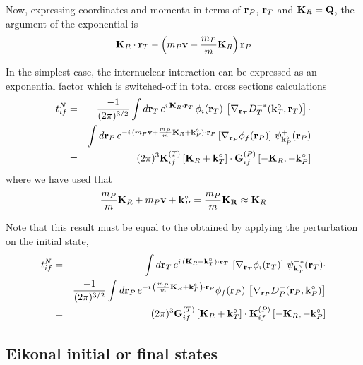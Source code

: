 Now, expressing coordinates and momenta in terms of $\mathbf{r}_{P}$,
$\mathbf{r}_{T}$ and $\mathbf{K}_{R}=\mathbf{Q}$, the argument of the exponential
is
\[
\mathbf{K}_{R} \cdot \mathbf{r}_{T} - \left( m_{P} \mathbf{v} + \frac{m_{P}}{m}
\mathbf{K}_{R} \right)\mathbf{r}_{P}
\]


In the simplest case, the internuclear interaction can be expressed as
an exponential factor which is switched-off in total cross sections
calculations
\begin{eqnarray}\label{Q:tif-cpt-noNN-f}
t_{if}^{N} &=& \frac{-1}{(2 \pi)^{3/2}}  \int d \mathbf{r}_{T} \,
e^{i \, \mathbf{K}_{R} \cdot \mathbf{r}_T} \, \phi_{i}(\mathbf{r}_T) \,\left[
\nabla_{\mathbf{r}_{T}} D^{-*}_{T}(\mathbf{k}^{\circ}_{T},\mathbf{r}_T) \right]  \cdot
\nonumber \\
&& \int d \mathbf{r}_{P} \, e^{- i \, (m_{P} \mathbf{v} +
\frac{m_{P}}{m} \mathbf{K}_{R} + \mathbf{k}_{P}^{\circ}) \cdot \mathbf{r}_{P}}
\left[\nabla_{\mathbf{r}_{P}} \phi_{f}(\mathbf{r}_{P}) \right] \,
\psi^{+}_{\mathbf{k}_{P}^{\circ}} (\mathbf{r}_{P}) \nonumber
\\
&=& (2 \pi)^{3} \mathbf{K}^{(T)}_{if}\left[ \mathbf{K}_{R} + \mathbf{k}_{T}^{\circ}
\right] \cdot \mathbf{G}^{(P)}_{if}\left[-\mathbf{K}_{R},-\mathbf{k}^{\circ}_{P}\right]
\end{eqnarray}
where we have used that
\[
\frac{m_{P}}{m} \mathbf{K}_{R} + m_{P}\mathbf{v} + \mathbf{k}_{P}^{\circ} =
\frac{m_{P}}{m} \mathbf{K_{R}} \approx \mathbf{K}_{R}
\]

Note that this result must be equal to the obtained by applying the
perturbation on the initial state,
%
\begin{eqnarray}\label{Q:tif-cpt-noNN-i}
t_{if}^{N} &=&  \int d \mathbf{r}_{T} \, e^{i \,(
\mathbf{K}_{R}+\mathbf{k}_{T}^{\circ}) \cdot \mathbf{r}_T} \,\left[ \nabla_{\mathbf{r}_{T}}
\phi_{i}(\mathbf{r}_T) \right] \, \psi^{-*}_{\mathbf{k}^{\circ}_{T}}(\mathbf{r}_T)   \cdot
\nonumber \\
&&\frac{-1}{(2 \pi)^{3/2}} \int d \mathbf{r}_{P} \, e^{- i \,
\left( \frac{m_{P}}{m} \mathbf{K}_{R} + \mathbf{k}_{P}^{\circ} \right) \cdot
\mathbf{r}_{P}} \phi_{f}(\mathbf{r}_{P}) \, \left[\nabla_{\mathbf{r}_{P}}
D^{+}_{P}(\mathbf{r}_{P},\mathbf{k}_{P}^{\circ}) \right]  \nonumber
\\
&=& (2 \pi)^{3} \mathbf{G}^{(T)}_{if}\left[ \mathbf{K}_{R} + \mathbf{k}_{T}^{\circ}
\right] \cdot \mathbf{K}^{(P)}_{if}\left[-\mathbf{K}_{R},-\mathbf{k}^{\circ}_{P}\right]
\end{eqnarray}

\subsection{Eikonal initial or final states}

